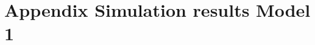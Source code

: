 \section{Appendix Simulation results Model 1}
\label{app:appendix_analysis1}
\begin{tabular}[H]
	
\end{tabular}

\clearpage
